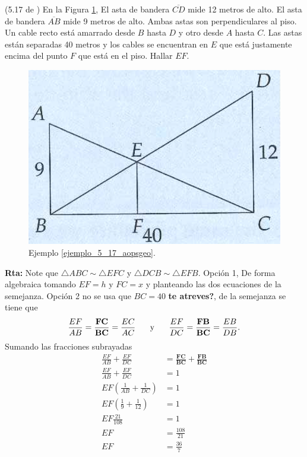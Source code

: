 \begin{ejemplo}{(5.17 de \cite{Aops_Geometria})}
	\label{ejemplo_5_17_aopsgeo}En la Figura \ref{5_17_aopsgeo}, El asta de bandera $\overline{CD}$ mide 12 metros de alto. El asta de bandera $\overline{AB}$ mide 9 metros de alto. Ambas astas son perpendiculares al piso. Un cable recto está amarrado desde $B$ hasta $D$ y otro desde $A$ hasta $C$. Las astas están separadas 40 metros y los cables se encuentran en $E$ que está justamente encima del punto $F$ que está en el piso. Hallar $EF$.
	\begin{figure}[H]
		\centering
		\includegraphics[width=0.3\linewidth]{Geometria/imgs/5_17_aopsgeo}
		\caption{Ejemplo \ref{ejemplo_5_17_aopsgeo}.}
		\label{5_17_aopsgeo}
	\end{figure}
	\textbf{Rta: }Note que $\triangle ABC \sim \triangle EFC$ y $\triangle DCB \sim \triangle EFB$. Opción 1, De forma algebraica tomando $EF=h$ y $FC=x$ y planteando las dos ecuaciones de la semejanza. Opción 2 no se usa que $BC=40$ \textbf{te atreves?}, de la semejanza se tiene que $$\frac{EF}{AB} = \frac{\textbf{FC}}{\textbf{BC}} = \frac{EC}{AC}\hspace{5mm}\text{ y }\hspace{5mm}\frac{EF}{DC} = \frac{\textbf{FB}}{\textbf{BC}} = \frac{EB}{DB}.$$
	Sumando las fracciones subrayadas 
	\begin{equation*}
		\begin{split}
			\frac{EF}{AB}  + \frac{EF}{DC} &= \frac{\textbf{FC}}{\textbf{BC}} + \frac{\textbf{FB}}{\textbf{BC}} \\
			\frac{EF}{AB}  + \frac{EF}{DC} &= 1 \\
			EF \left( \frac{1}{AB}  + \frac{1}{DC} \right) &=1\\
			EF \left( \frac{1}{9}  + \frac{1}{12} \right) &=1\\
			EF \frac{21}{108} &=1\\
			EF &= \frac{108}{21}\\
			EF  &= \frac{36}{7}
		\end{split}
	\end{equation*}
\end{ejemplo}

